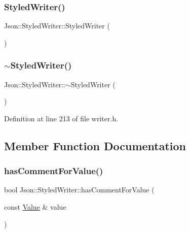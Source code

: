 \subsubsection{\texorpdfstring{Styled\+Writer()}{StyledWriter()}\hspace{0.1cm}{\footnotesize\ttfamily [2/2]}}
{\footnotesize\ttfamily Json\+::\+Styled\+Writer\+::\+Styled\+Writer (\begin{DoxyParamCaption}{ }\end{DoxyParamCaption})}

\hypertarget{class_json_1_1_styled_writer_a6a18380a4c5dd5e37a892dc182aac88c}{}\label{class_json_1_1_styled_writer_a6a18380a4c5dd5e37a892dc182aac88c} 
\subsubsection{\texorpdfstring{$\sim$\+Styled\+Writer()}{~StyledWriter()}\hspace{0.1cm}{\footnotesize\ttfamily [2/2]}}
{\footnotesize\ttfamily Json\+::\+Styled\+Writer\+::$\sim$\+Styled\+Writer (\begin{DoxyParamCaption}{ }\end{DoxyParamCaption})\hspace{0.3cm}{\ttfamily [inline]}}



Definition at line 213 of file writer.\+h.



\subsection{Member Function Documentation}
\hypertarget{class_json_1_1_styled_writer_a37a806d010f708cb68556f2666f79bdf}{}\label{class_json_1_1_styled_writer_a37a806d010f708cb68556f2666f79bdf} 
\subsubsection{\texorpdfstring{has\+Comment\+For\+Value()}{hasCommentForValue()}\hspace{0.1cm}{\footnotesize\ttfamily [1/2]}}
{\footnotesize\ttfamily bool Json\+::\+Styled\+Writer\+::has\+Comment\+For\+Value (\begin{DoxyParamCaption}\item[{const \hyperlink{class_json_1_1_value}{Value} \&}]{value }\end{DoxyParamCaption})\hspace{0.3cm}{\ttfamily [private]}}

